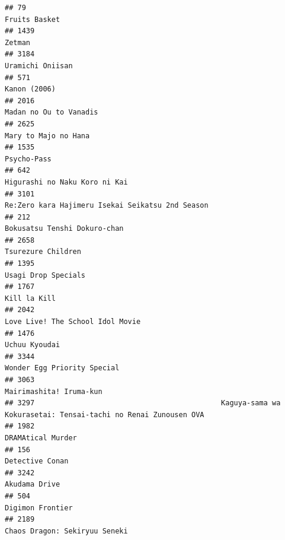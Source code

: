 \documentclass[
]{article}
\begin{document}
\begin{verbatim}
## 79                                                                                               Fruits Basket
## 1439                                                                                                    Zetman
## 3184                                                                                          Uramichi Oniisan
## 571                                                                                               Kanon (2006)
## 2016                                                                                    Madan no Ou to Vanadis
## 2625                                                                                      Mary to Majo no Hana
## 1535                                                                                               Psycho-Pass
## 642                                                                              Higurashi no Naku Koro ni Kai
## 3101                                                          Re:Zero kara Hajimeru Isekai Seikatsu 2nd Season
## 212                                                                               Bokusatsu Tenshi Dokuro-chan
## 2658                                                                                        Tsurezure Children
## 1395                                                                                       Usagi Drop Specials
## 1767                                                                                              Kill la Kill
## 2042                                                                          Love Live! The School Idol Movie
## 1476                                                                                             Uchuu Kyoudai
## 3344                                                                               Wonder Egg Priority Special
## 3063                                                                                   Mairimashita! Iruma-kun
## 3297                                            Kaguya-sama wa Kokurasetai: Tensai-tachi no Renai Zunousen OVA
## 1982                                                                                         DRAMAtical Murder
## 156                                                                                            Detective Conan
## 3242                                                                                             Akudama Drive
## 504                                                                                           Digimon Frontier
## 2189                                                                             Chaos Dragon: Sekiryuu Seneki

\end{verbatim}
\end{document}
